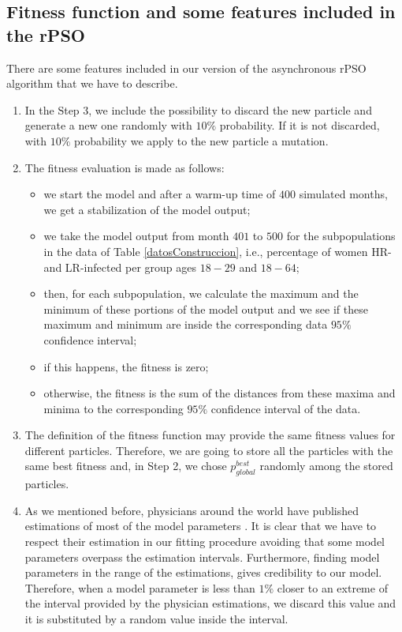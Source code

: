 \subsection{Fitness function and some features included in the rPSO}\label{sec:rPSO}
There are some features included in our version of the asynchronous rPSO algorithm that we have to describe. 

\begin{enumerate}
	\item In the Step 3, we include the possibility to discard the new particle and generate a new one randomly with $10\%$ probability. If it is not discarded, with $10\%$ probability we apply to the new particle a mutation.  
	\item The fitness evaluation is made as follows: 
	\begin{itemize}
		\item we start the model and after a warm-up time of $ 400 $ simulated months, we get a stabilization of the model output; 
		\item we take the model output from month $ 401 $ to $ 500 $ for the subpopulations in the data of Table \ref{datosConstruccion}, i.e., percentage of women HR- and LR-infected per group ages $18-29$ and $18-64$;  
		\item then, for each subpopulation, we calculate the maximum and the minimum of these portions of the model output and we see if these maximum and minimum are inside the corresponding data $95\%$ confidence interval;
		\item if this happens, the fitness is zero; 
		\item otherwise, the fitness is the sum of the distances from these maxima and minima to the corresponding $95\%$ confidence interval of the data.
	\end{itemize}
	
	\item The definition of the fitness function may provide the same fitness values for different particles. Therefore, we are going to store all the particles with the same best fitness and, in Step 2, we chose  $p_{global}^{best}$ randomly among the stored particles.	
	\item As we mentioned before, physicians around the world have published estimations of most of the model parameters \cite{Durex2002,elbasha2007model,Giuliano2011,Nyitray2015}. It is clear that we have to respect their estimation in our fitting procedure avoiding that some model parameters overpass the estimation intervals. Furthermore, finding model parameters in the range of the estimations, gives credibility to our model. Therefore, when a model parameter is less than $1\%$ closer to an extreme of the interval provided by the physician estimations, we discard this value and it is substituted by a random value inside the interval.  
\end{enumerate}

